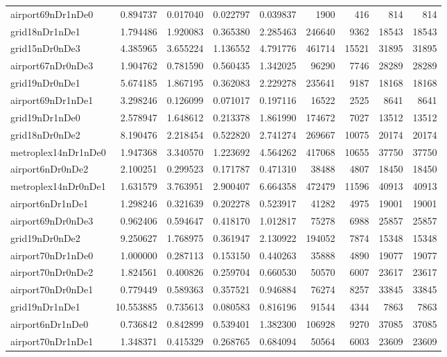 \begin{longtable}{|l|r|r|r|r|r|r|r|r|}
airport69nDr1nDe0 & 0.894737 & 0.017040 & 0.022797 & 0.039837 & 1900 & 416 & 814 & 814 \\
grid18nDr1nDe1 & 1.794486 & 1.920083 & 0.365380 & 2.285463 & 246640 & 9362 & 18543 & 18543 \\
grid15nDr0nDe3 & 4.385965 & 3.655224 & 1.136552 & 4.791776 & 461714 & 15521 & 31895 & 31895 \\
airport67nDr0nDe3 & 1.904762 & 0.781590 & 0.560435 & 1.342025 & 96290 & 7746 & 28289 & 28289 \\
grid19nDr0nDe1 & 5.674185 & 1.867195 & 0.362083 & 2.229278 & 235641 & 9187 & 18168 & 18168 \\
airport69nDr1nDe1 & 3.298246 & 0.126099 & 0.071017 & 0.197116 & 16522 & 2525 & 8641 & 8641 \\
grid19nDr1nDe0 & 2.578947 & 1.648612 & 0.213378 & 1.861990 & 174672 & 7027 & 13512 & 13512 \\
grid18nDr0nDe2 & 8.190476 & 2.218454 & 0.522820 & 2.741274 & 269667 & 10075 & 20174 & 20174 \\
metroplex14nDr1nDe0 & 1.947368 & 3.340570 & 1.223692 & 4.564262 & 417068 & 10655 & 37750 & 37750 \\
airport6nDr0nDe2 & 2.100251 & 0.299523 & 0.171787 & 0.471310 & 38488 & 4807 & 18450 & 18450 \\
metroplex14nDr0nDe1 & 1.631579 & 3.763951 & 2.900407 & 6.664358 & 472479 & 11596 & 40913 & 40913 \\
airport6nDr1nDe1 & 1.298246 & 0.321639 & 0.202278 & 0.523917 & 41282 & 4975 & 19001 & 19001 \\
airport69nDr0nDe3 & 0.962406 & 0.594647 & 0.418170 & 1.012817 & 75278 & 6988 & 25857 & 25857 \\
grid19nDr0nDe2 & 9.250627 & 1.768975 & 0.361947 & 2.130922 & 194052 & 7874 & 15348 & 15348 \\
airport70nDr1nDe0 & 1.000000 & 0.287113 & 0.153150 & 0.440263 & 35888 & 4890 & 19077 & 19077 \\
airport70nDr0nDe2 & 1.824561 & 0.400826 & 0.259704 & 0.660530 & 50570 & 6007 & 23617 & 23617 \\
airport70nDr0nDe1 & 0.779449 & 0.589363 & 0.357521 & 0.946884 & 76274 & 8257 & 33845 & 33845 \\
grid19nDr1nDe1 & 10.553885 & 0.735613 & 0.080583 & 0.816196 & 91544 & 4344 & 7863 & 7863 \\
airport6nDr1nDe0 & 0.736842 & 0.842899 & 0.539401 & 1.382300 & 106928 & 9270 & 37085 & 37085 \\
airport70nDr1nDe1 & 1.348371 & 0.415329 & 0.268765 & 0.684094 & 50564 & 6003 & 23609 & 23609 \\

\end{longtable}
